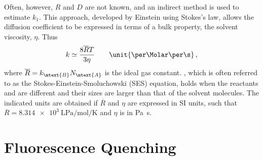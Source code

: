 \documentclass[nobib,nofonts,nols,nohyper]{tufte-handout}
\begin{document}
Often, however, \( R \) and \( D \) are not known, and an indirect method is used to estimate \( k_1 \). 
This approach, developed by Einstein using Stokes's law, allows the diffusion coefficient to be expressed in terms of a bulk property, the solvent viscosity, \( \eta \). Thus
\begin{equation}
	k \simeq \frac{8 \overline{R} T}{3 \eta} \qquad \unit{\per\Molar \per \s} \, ,
	\label{eq:rateapprox}
\end{equation}
where \( \overline{R} = k_\mtext{B} N_\mtext{A} \) is the ideal gas constant.%
, which is often referred to as the Stokes-Einstein-Smoluchowski (SES) equation, holds when the reactants  and  are different and their sizes are larger than that of the solvent molecules. 
The indicated units are obtained if \( \overline{R} \) and \( \eta \) are expressed in SI units, such that \( \overline{R} = \qty{8.314e3}{\L \Pa \per \mol \per \K} \) and \( \eta \) is in \unit[inter-unit-product=\ensuremath{{}\!\cdot\!{}}]{\Pa \s}.

\section{Fluorescence Quenching} %
\label{sec:fl_quenching}
\end{document}
